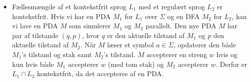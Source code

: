 \begin{frame}[allowframebreaks]
\begin{itemize}
		\item Fællesmængde af et kontekstfrit sprog $L_1$ med et regulært sprog $L_2$ er kontekstfrit. Hvis vi har en PDA $M_1$ for $L_1$ over $\Sigma$ og en DFA $M_2$ for $L_2$, kan vi lave en PDA $M$ som simulerer $M_1$ og $M_2$ parallelt. Den nye PDA $M$ har par af tilstande $(q, p)$, hvor $q$ er den aktuelle tilstand af $M_1$ og $p$ den aktuelle tilstand af $M_2$. Når $M$ læser et symbol $a \in \Sigma$, opdaterer den både $M_1$'s tilstand og stak samt $M_2$'s tilstand. $M$ accepterer en streng $w$ hvis og kun hvis både $M_1$ accepterer $w$ (med tom stak) og $M_2$ accepterer $w$. Derfor er $L_1 \cap L_2$ kontekstfrit, da det accepteres af en PDA.
	\end{itemize}
\end{frame}






